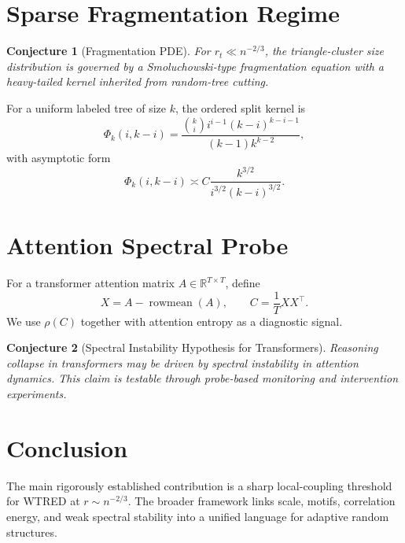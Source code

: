 \documentclass[11pt]{article}
\newtheorem{conjecture}{Conjecture}
\begin{document}
\section{Sparse Fragmentation Regime}
\begin{conjecture}[Fragmentation PDE]
For $r_t\ll n^{-2/3}$, the triangle-cluster size distribution is governed by a Smoluchowski-type fragmentation equation with a heavy-tailed kernel inherited from random-tree cutting.
\end{conjecture}

For a uniform labeled tree of size $k$, the ordered split kernel is
\[
\Phi_k(i,k-i)=\frac{\binom{k}{i}i^{i-1}(k-i)^{k-i-1}}{(k-1)k^{k-2}},
\]
with asymptotic form
\[
\Phi_k(i,k-i)\asymp C\frac{k^{3/2}}{i^{3/2}(k-i)^{3/2}}.
\]

\section{Attention Spectral Probe}
For a transformer attention matrix $A\in\mathbb R^{T\times T}$, define
\[
X=A-\operatorname{rowmean}(A), \qquad C=\frac{1}{T}XX^\top.
\]
We use $\rho(C)$ together with attention entropy as a diagnostic signal.

\begin{conjecture}[Spectral Instability Hypothesis for Transformers]
Reasoning collapse in transformers may be driven by spectral instability in attention dynamics. This claim is testable through probe-based monitoring and intervention experiments.
\end{conjecture}

\section{Conclusion}
The main rigorously established contribution is a sharp local-coupling threshold for WTRED at $r\sim n^{-2/3}$. The broader framework links scale, motifs, correlation energy, and weak spectral stability into a unified language for adaptive random structures.
\end{document}
